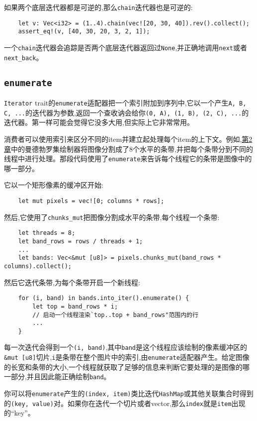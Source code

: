 如果两个底层迭代器都是可逆的,那么\texttt{chain}迭代器也是可逆的:
\begin{verbatim}
    let v: Vec<i32> = (1..4).chain(vec![20, 30, 40]).rev().collect();
    assert_eq!(v, [40, 30, 20, 3, 2, 1]);
\end{verbatim}

一个\texttt{chain}迭代器会追踪是否两个底层迭代器返回过\texttt{None},并正确地调用\texttt{next}或者\texttt{next\_back}。

\subsection{\texttt{enumerate}}\label{enumerate}
\texttt{Iterator} trait的\texttt{enumerate}适配器把一个索引附加到序列中,它以一个产生\texttt{A, B, C, ...}的迭代器为参数,返回一个查收讷会给你\texttt{(0, A), (1, B), (2, C), ...}的迭代器。第一样可能会觉得它没多大用,但实际上它非常常用。

消费者可以使用索引来区分不同的item并建立起处理每个item的上下文。例如,\hyperref[ch02]{第2章}中的曼德勃罗集绘制器将图像分割成了8个水平的条带,并把每个条带分到不同的线程中进行处理。那段代码使用了\texttt{enumerate}来告诉每个线程它的条带是图像中的哪一部分。

它以一个矩形像素的缓冲区开始:
\begin{verbatim}
    let mut pixels = vec![0; columns * rows];
\end{verbatim}
然后,它使用了\texttt{chunks\_mut}把图像分割成水平的条带,每个线程一个条带:
\begin{verbatim}
    let threads = 8;
    let band_rows = rows / threads + 1;
    ...
    let bands: Vec<&mut [u8]> = pixels.chunks_mut(band_rows * columns).collect();
\end{verbatim}

然后它迭代条带,为每个条带开启一个新线程:
\begin{verbatim}
    for (i, band) in bands.into_iter().enumerate() {
        let top = band_rows * i;
        // 启动一个线程渲染`top..top + band_rows"范围内的行
        ...
    }
\end{verbatim}

每一次迭代会得到一个\texttt{(i, band)},其中\texttt{band}是这个线程应该绘制的像素缓冲区的\texttt{\&mut [u8]}切片,\texttt{i}是条带在整个图片中的索引,由\texttt{enumerate}适配器产生。给定图像的长宽和条带的大小,一个线程就获取了足够的信息来判断它要处理的是图像的哪一部分,并且因此能正确绘制\texttt{band}。

你可以将\texttt{enumerate}产生的\texttt{(index, item)}类比迭代\texttt{HashMap}或其他关联集合时得到的\texttt{(key, value)}对。如果你在迭代一个切片或者vector,那么\texttt{index}就是\texttt{item}出现的“key”。

